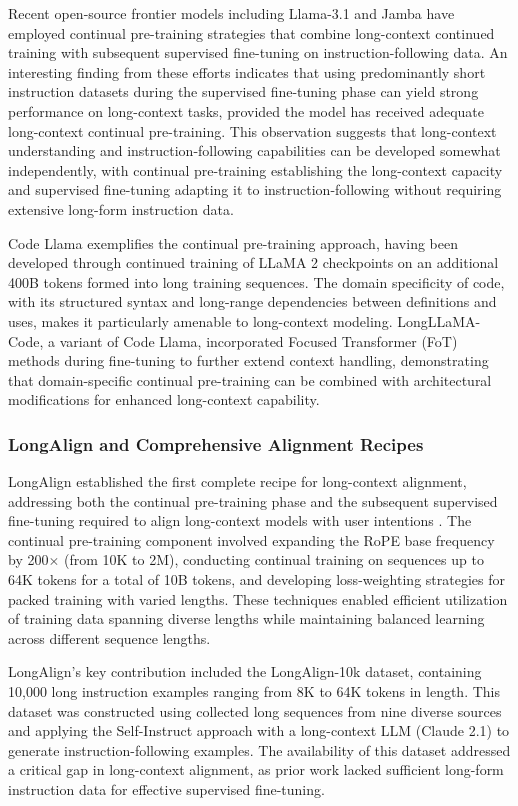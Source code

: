 \documentclass[11pt,letterpaper]{article}
\begin{document}
Recent open-source frontier models including Llama-3.1 and Jamba have employed continual pre-training strategies that combine long-context continued training with subsequent supervised fine-tuning on instruction-following data. An interesting finding from these efforts indicates that using predominantly short instruction datasets during the supervised fine-tuning phase can yield strong performance on long-context tasks, provided the model has received adequate long-context continual pre-training. This observation suggests that long-context understanding and instruction-following capabilities can be developed somewhat independently, with continual pre-training establishing the long-context capacity and supervised fine-tuning adapting it to instruction-following without requiring extensive long-form instruction data.

Code Llama exemplifies the continual pre-training approach, having been developed through continued training of LLaMA 2 checkpoints on an additional 400B tokens formed into long training sequences. The domain specificity of code, with its structured syntax and long-range dependencies between definitions and uses, makes it particularly amenable to long-context modeling. LongLLaMA-Code, a variant of Code Llama, incorporated Focused Transformer (FoT) methods during fine-tuning to further extend context handling, demonstrating that domain-specific continual pre-training can be combined with architectural modifications for enhanced long-context capability.

\subsubsection{LongAlign and Comprehensive Alignment Recipes}

LongAlign established the first complete recipe for long-context alignment, addressing both the continual pre-training phase and the subsequent supervised fine-tuning required to align long-context models with user intentions \cite{longalign2024}. The continual pre-training component involved expanding the RoPE base frequency by 200$\times$ (from 10K to 2M), conducting continual training on sequences up to 64K tokens for a total of 10B tokens, and developing loss-weighting strategies for packed training with varied lengths. These techniques enabled efficient utilization of training data spanning diverse lengths while maintaining balanced learning across different sequence lengths.

LongAlign's key contribution included the LongAlign-10k dataset, containing 10,000 long instruction examples ranging from 8K to 64K tokens in length. This dataset was constructed using collected long sequences from nine diverse sources and applying the Self-Instruct approach with a long-context LLM (Claude 2.1) to generate instruction-following examples. The availability of this dataset addressed a critical gap in long-context alignment, as prior work lacked sufficient long-form instruction data for effective supervised fine-tuning.
\end{document}
